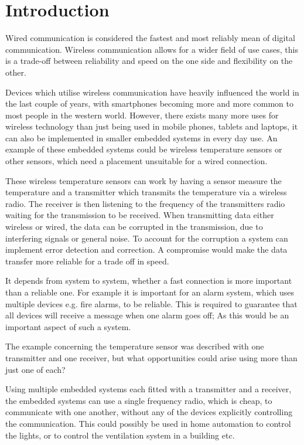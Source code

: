 \chapter{Introduction}
\vspace{-20pt}
Wired communication is considered the fastest and  most reliably mean of digital communication.
Wireless communication allows for a wider field of use cases, this is a trade-off between reliability and speed on the one side and flexibility on the other. \cite{wirelessTradeoffs}

Devices which utilise wireless communication have heavily influenced the world in the last couple of years, with smartphones becoming more and more common to most people in the western world. \cite{2013-SmartPhoneUse}
However, there exists many more uses for wireless technology than just being used in mobile phones, tablets and laptops, it can also be implemented in smaller embedded systems in every day use.
An example of these embedded systems could be wireless temperature sensors or other sensors, which need a placement unsuitable for a wired connection.

These wireless temperature sensors can work by having a sensor measure the temperature and a transmitter which transmits the temperature via a wireless radio.
The receiver is then listening to the frequency of the transmitters radio waiting for the transmission to be received.
When transmitting data either wireless or wired, the data can be corrupted in the transmission, due to interfering signals or general noise.
To account for the corruption a system can implement error detection and correction.
A compromise would make the data transfer more reliable for a trade off in speed.

It depends from system to system, whether a fast connection is more important than a reliable one.
For example it is important for an alarm system, which uses multiple devices e.g. fire alarms, to be reliable.
This is required to guarantee that all devices will receive a message when one alarm goes off;
As this would be an important aspect of such a system.

The example concerning the temperature sensor was described with one transmitter and one receiver, but what opportunities could arise using more than just one of each?

\bigskip

Using multiple embedded systems each fitted with a transmitter and a receiver, the embedded systems can use a single frequency radio, which is cheap, to communicate with one another, without any of the devices explicitly controlling the communication.
This could possibly be used in home automation to control the lights, or to control the ventilation system in a building etc.